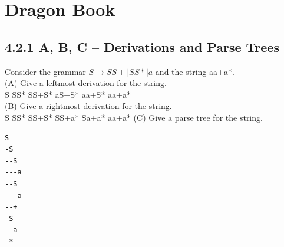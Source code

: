 \documentclass[letterpaper, 10pt]{article}
\begin{document}
\section{Dragon Book}
\subsection{4.2.1 A, B, C -- Derivations and Parse Trees}
Consider the grammar $S \to S S + | S S * | a$ and the string aa+a*. \\
(A) Give a leftmost derivation for the string. \\
S \newline
SS* \newline
SS+S* \newline
aS+S* \newline
aa+S* \newline
aa+a* \newline
\\
(B) Give a rightmost derivation for the string. \\
S \newline
SS* \newline
SS+S* \newline
SS+a* \newline
Sa+a* \newline
aa+a* \newline
\newpage
\noindent
(C) Give a parse tree for the string. \\
\begin{verbatim}
S
-S
--S
---a
--S
---a
--+
-S
--a
-*
\end{verbatim}
\end{document}
